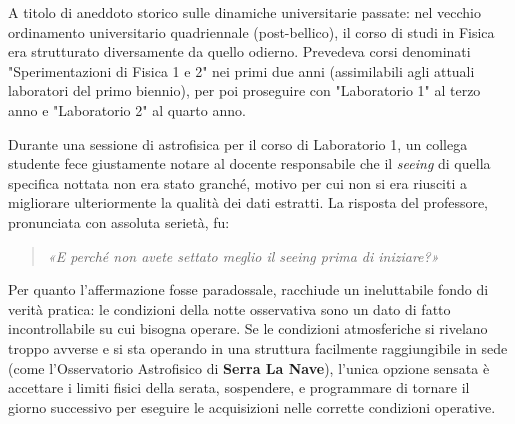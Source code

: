 A titolo di aneddoto storico sulle dinamiche universitarie passate: nel vecchio ordinamento universitario quadriennale (post-bellico), il corso di studi in Fisica era strutturato diversamente da quello odierno. Prevedeva corsi denominati "Sperimentazioni di Fisica 1 e 2" nei primi due anni (assimilabili agli attuali laboratori del primo biennio), per poi proseguire con "Laboratorio 1" al terzo anno e "Laboratorio 2" al quarto anno.

Durante una sessione di astrofisica per il corso di Laboratorio 1, un collega studente fece giustamente notare al docente responsabile che il \textit{seeing} di quella specifica nottata non era stato granché, motivo per cui non si era riusciti a migliorare ulteriormente la qualità dei dati estratti.
La risposta del professore, pronunciata con assoluta serietà, fu:
\begin{quote}
\textit{«E perché non avete settato meglio il seeing prima di iniziare?»}
\end{quote}

Per quanto l'affermazione fosse paradossale, racchiude un ineluttabile fondo di verità pratica: le condizioni della notte osservativa sono un dato di fatto incontrollabile su cui bisogna operare. Se le condizioni atmosferiche si rivelano troppo avverse e si sta operando in una struttura facilmente raggiungibile in sede (come l'Osservatorio Astrofisico di \textbf{Serra La Nave}), l'unica opzione sensata è accettare i limiti fisici della serata, sospendere, e programmare di tornare il giorno successivo per eseguire le acquisizioni nelle corrette condizioni operative.
